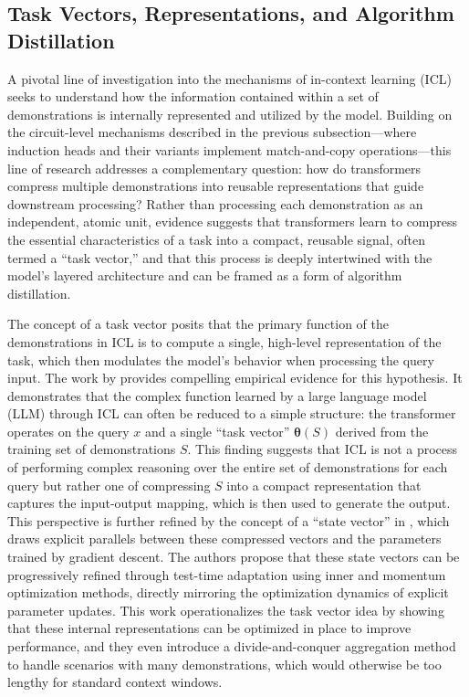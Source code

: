 \documentclass[11pt]{article}
\begin{document}
\subsection{Task Vectors, Representations, and Algorithm Distillation}

A pivotal line of investigation into the mechanisms of in-context learning (ICL) seeks to understand how the information contained within a set of demonstrations is internally represented and utilized by the model. Building on the circuit-level mechanisms described in the previous subsection---where induction heads and their variants implement match-and-copy operations---this line of research addresses a complementary question: how do transformers compress multiple demonstrations into reusable representations that guide downstream processing? Rather than processing each demonstration as an independent, atomic unit, evidence suggests that transformers learn to compress the essential characteristics of a task into a compact, reusable signal, often termed a ``task vector,'' and that this process is deeply intertwined with the model's layered architecture and can be framed as a form of algorithm distillation.

The concept of a task vector posits that the primary function of the demonstrations in ICL is to compute a single, high-level representation of the task, which then modulates the model's behavior when processing the query input. The work by \cite{ref22} provides compelling empirical evidence for this hypothesis. It demonstrates that the complex function learned by a large language model (LLM) through ICL can often be reduced to a simple structure: the transformer operates on the query \(x\) and a single ``task vector'' \(\boldsymbol{\theta}(S)\) derived from the training set of demonstrations \(S\). This finding suggests that ICL is not a process of performing complex reasoning over the entire set of demonstrations for each query but rather one of compressing \(S\) into a compact representation that captures the input-output mapping, which is then used to generate the output. This perspective is further refined by the concept of a ``state vector'' in \cite{ref62}, which draws explicit parallels between these compressed vectors and the parameters trained by gradient descent. The authors propose that these state vectors can be progressively refined through test-time adaptation using inner and momentum optimization methods, directly mirroring the optimization dynamics of explicit parameter updates. This work operationalizes the task vector idea by showing that these internal representations can be optimized in place to improve performance, and they even introduce a divide-and-conquer aggregation method to handle scenarios with many demonstrations, which would otherwise be too lengthy for standard context windows.
\end{document}
